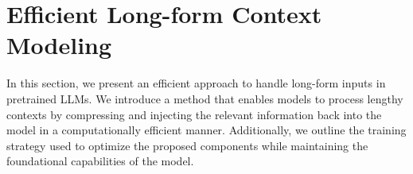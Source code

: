 \section{Efficient Long-form Context Modeling}
In this section, we present an efficient approach to handle long-form inputs in pretrained LLMs. We introduce a method that enables models to process lengthy contexts by compressing and injecting the relevant information back into the model in a computationally efficient manner. Additionally, we outline the training strategy used to optimize the proposed components while maintaining the foundational capabilities of the model.


\newcommand{\vx}{\mathbf{x}}
\newcommand{\vy}{\mathbf{y}}
\newcommand{\ve}{\mathbf{e}}
\newcommand{\vh}{\mathbf{h}}
\newcommand{\vs}{\mathbf{s}}




